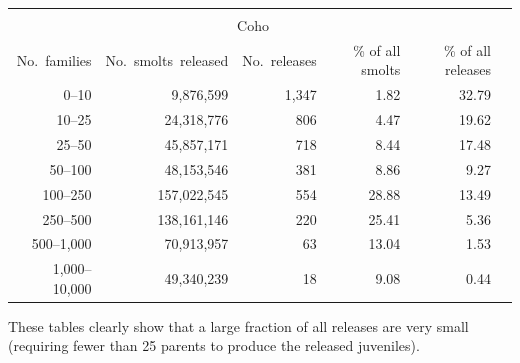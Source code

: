 \documentclass[11pt]{article}
\begin{document}
\begin{table}
\begin{center}
\begin{tabular}{rrrrrr}
\mbox{}\\
\multicolumn{5}{c}{Coho}\\
No.~families  &  No.~smolts~released  &  No.~releases  &  \% of all smolts  &  \% of all releases \\ \hline
0--10  &    9,876,599  &  1,347  &  1.82  &  32.79\\
10--25  &   24,318,776  &    806  &  4.47  &  19.62\\
25--50  &   45,857,171  &    718  &  8.44  &  17.48\\
50--100  &   48,153,546  &    381  &  8.86  &  9.27\\
100--250  &  157,022,545  &    554  &  28.88  &  13.49\\
250--500  &  138,161,146  &    220  &  25.41  &  5.36\\
500--1,000  &   70,913,957  &     63  &  13.04  &  1.53\\
1,000--10,000  &   49,340,239  &     18  &  9.08  &  0.44\\
\hline\hline
\end{tabular}
\end{center}
\end{table}
These tables clearly show that a large fraction of all releases are very small (requiring fewer than 25 parents to produce the released juveniles).
\end{document}
